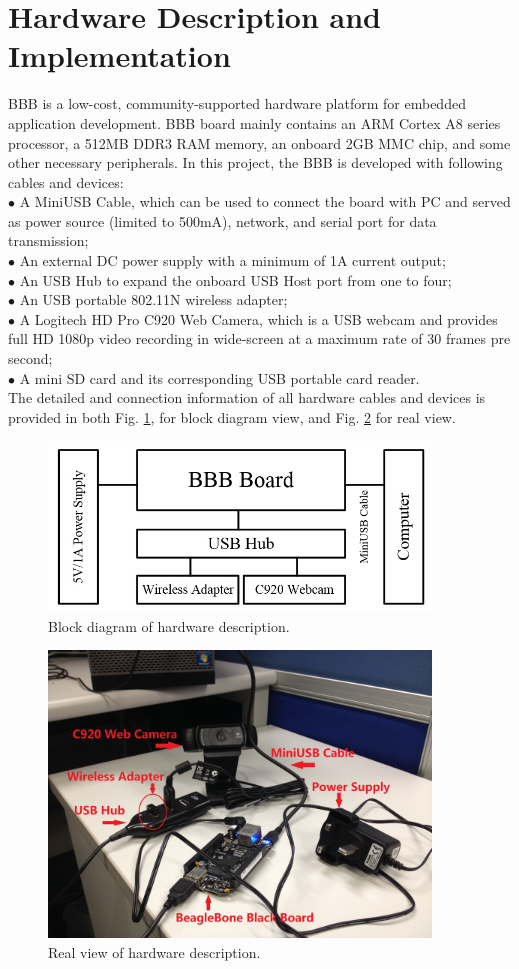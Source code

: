 \documentclass[12pt,journal,draftclsnofoot,onecolumn]{IEEEtran}
\begin{document}
\section{Hardware Description and Implementation}\label{HdDes}
BBB is a low-cost, community-supported hardware platform for embedded application development. BBB board mainly contains an ARM Cortex A8 series processor, a 512MB DDR3 RAM memory, an onboard 2GB MMC chip, and some other necessary peripherals. In this project, the BBB is developed with following cables and devices: \\
$\bullet$ A MiniUSB Cable, which can be used to connect the board with PC and served as power source (limited to 500mA), network, and serial port for data transmission;\\
$\bullet$ An external DC power supply with a minimum of 1A current output;\\
$\bullet$ An USB Hub to expand the onboard USB Host port from one to four;\\
$\bullet$ An USB portable 802.11N wireless adapter;\\
$\bullet$ A Logitech HD Pro C920 Web Camera, which is a USB webcam and provides full HD 1080p video recording in wide-screen at a maximum rate of 30 frames pre second;\\
$\bullet$ A mini SD card and its corresponding USB portable card reader.\\
The detailed and connection information of all hardware cables and devices is provided in both Fig. \ref{hw1}, for block diagram view, and Fig. \ref{hw2} for real view.
\begin{figure}[ht]
	\centering
	\includegraphics[width=4in]{./figs/hw1.jpg}
	\caption{Block diagram of hardware description.}
	\label{hw1}
\end{figure}
\begin{figure}[ht]
	\centering
	\includegraphics[width=4in]{./figs/hw2.jpg}
	\caption{Real view of hardware description.}
	\label{hw2}
\end{figure}
\end{document}
